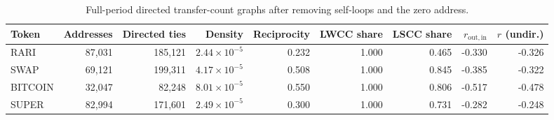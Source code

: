 \begin{table}[t]
\centering
\small
\caption{Full-period directed transfer-count graphs after removing self-loops and the zero address.}
\label{tab:overview}
\begin{tabular}{lrrrrrrrr}
\toprule
Token & Addresses & Directed ties & Density & Reciprocity & LWCC share & LSCC share & $r_{\mathrm{out,in}}$ & $r$ (undir.) \\
\midrule
RARI & 87{,}031 & 185{,}121 & $2.44\times10^{-5}$ & 0.232 & 1.000 & 0.465 & -0.330 & -0.326 \\
SWAP & 69{,}121 & 199{,}311 & $4.17\times10^{-5}$ & 0.508 & 1.000 & 0.845 & -0.385 & -0.322 \\
BITCOIN & 32{,}047 & 82{,}248 & $8.01\times10^{-5}$ & 0.550 & 1.000 & 0.806 & -0.517 & -0.478 \\
SUPER & 82{,}994 & 171{,}601 & $2.49\times10^{-5}$ & 0.300 & 1.000 & 0.731 & -0.282 & -0.248 \\
\bottomrule
\end{tabular}
\end{table}

